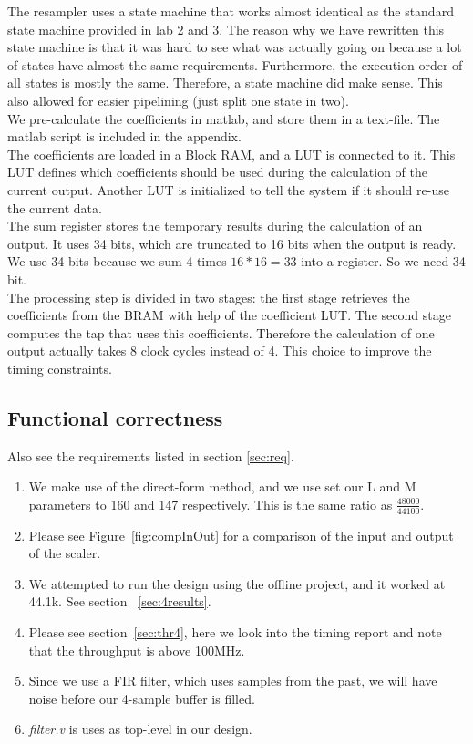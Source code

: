 \documentclass[a4paper,twoside,11pt, fleqn]{article}
\begin{document}
The resampler uses a state machine that works almost identical as the standard state machine provided in lab 2 and 3. The reason why we have rewritten this state machine is that it was hard to see what was actually going on because a lot of states have almost the same requirements. Furthermore, the execution order of all states is mostly the same. Therefore, a state machine did make sense. This also allowed for easier pipelining (just split one state in two).\\

We pre-calculate the coefficients in matlab, and store them in a text-file. The matlab script is included in the appendix.\\

The coefficients are loaded in a Block RAM, and a LUT is connected to it. This LUT defines which coefficients should be used during the calculation of the current output. Another LUT is initialized to tell the system if it should re-use the current data.\\

The sum register stores the temporary results during the calculation of an output. It uses 34 bits, which are truncated to 16 bits when the output is ready. We use 34 bits because we sum 4 times $16*16=33$ into a register. So we need 34 bit. \\

The processing step is divided in two stages: the first stage retrieves the coefficients from the BRAM with help of the coefficient LUT. The second stage computes the tap that uses this coefficients. Therefore the calculation of one output actually takes 8 clock cycles instead of 4. This choice to improve the timing constraints.

\subsection{Functional correctness}
Also see the requirements listed in section \ref{sec:req}.

\begin{enumerate}
	\item We make use of the direct-form method, and we use set our L and M parameters to 160 and 147 respectively. This is the same ratio as $\frac{48000}{44100}$.
	\item Please see Figure~\ref{fig:compInOut} for a comparison of the input and output of the scaler.
	\item We attempted to run the design using the offline project, and it worked at 44.1k. See section ~\ref{sec:4results}.
	\item Please see section~\ref{sec:thr4}, here we look into the timing report and note that the throughput is above 100MHz.
	\item Since we use a FIR filter, which uses samples from the past, we will have noise before our 4-sample buffer is filled.
	\item \textit{filter.v} is uses as top-level in our design.
\end{enumerate}
\end{document}
